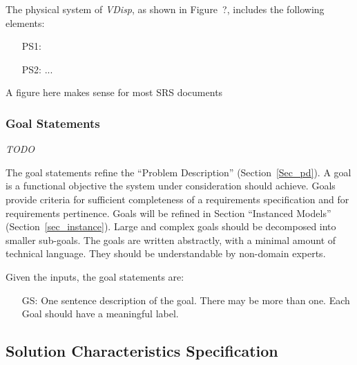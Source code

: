 \documentclass[12pt]{article}
\newcounter{goalnum} %
\begin{document}
The physical system of \emph{VDisp}{}, as shown in Figure~?,
includes the following elements:

\begin{itemize}

\item[PS1:] 

\item[PS2:] ...

\end{itemize}

A figure here makes sense for most SRS documents


\subsubsection{Goal Statements}

\emph{TODO}

The goal statements refine the ``Problem Description'' (Section~\ref{Sec_pd}).
A goal is a functional objective the system under consideration should achieve.
Goals provide criteria for sufficient completeness of a requirements
specification and for requirements pertinence. Goals will be refined in Section
“Instanced Models” (Section~\ref{sec_instance}). Large and complex goals should
be decomposed into smaller sub-goals.  The goals are written abstractly, with a
minimal amount of technical language.  They should be understandable by
non-domain experts.

\noindent Given the inputs, the goal statements are:

\begin{itemize}

\item[GS\refstepcounter{goalnum}\thegoalnum \label{G_meaningfulLabel}:] One
    sentence description of the goal.  There may be more than one.  Each Goal
    should have a meaningful label.

\end{itemize}

\subsection{Solution Characteristics Specification}
\end{document}
